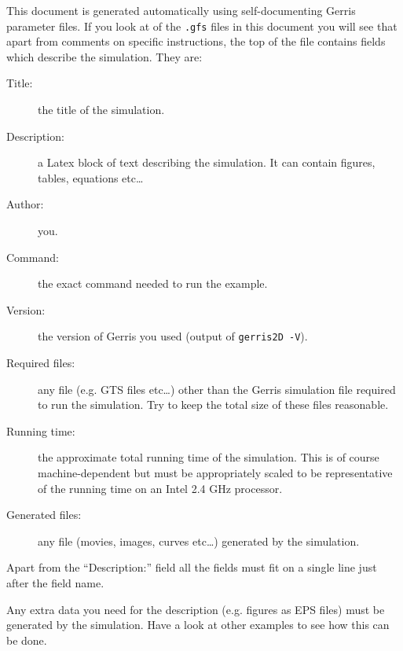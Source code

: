 \documentclass[a4paper]{article}
\newcommand{\htmladdnormallinkfoot}[2]{\footahref{#2}{#1}}
\begin{document}
This document is generated automatically using self-documenting Gerris parameter files. If you look at \htmladdnormallinkfoot{any}{cylinder/cylinder.gfs} of the {\tt .gfs} files in this document you will see that apart from comments on specific instructions, the top of the file contains fields which describe the simulation. They are:
\begin{description}
\item[Title:] the title of the simulation.
\item[Description:] a Latex block of text describing the simulation. It can contain figures, tables, equations etc\dots
\item[Author:] you.
\item[Command:] the exact command needed to run the example.
\item[Version:] the version of Gerris you used (output of {\tt gerris2D -V}).
\item[Required files:] any file (e.g. GTS files etc\dots) other than the Gerris simulation file required to run the simulation. Try to keep the total size of these files reasonable.
\item[Running time:] the approximate total running time of the simulation. This is of course machine-dependent but must be appropriately scaled to be representative of the running time on an Intel 2.4 GHz processor.
\item[Generated files:] any file (movies, images, curves etc\dots) generated by the simulation.
\end{description}
Apart from the ``Description:'' field all the fields must fit on a single line just after the field name.

Any extra data you need for the description (e.g. figures as EPS files) must be generated by the simulation. Have a look at other examples to see how this can be done.
\end{document}

